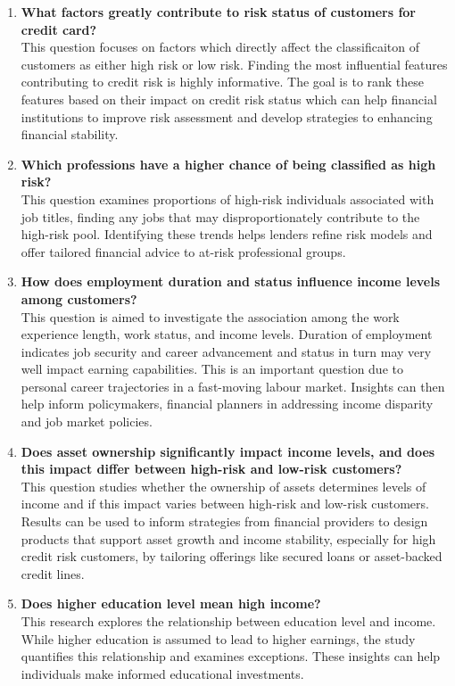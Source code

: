 \documentclass{article}\usepackage[]{graphicx}\usepackage[]{xcolor}
\begin{document}
\begin{enumerate}
\item \textbf{What factors greatly contribute to risk status of customers for credit card?} \\ This question focuses on factors which directly affect the classificaiton of customers as either high risk or low risk. Finding the most influential features contributing to credit risk is highly informative. The goal is to rank these features based on their impact on credit risk status which can help financial institutions to improve risk assessment and develop strategies to enhancing financial stability.\\
\item \textbf{Which professions have a higher chance of being classified as high risk?} \\ This question examines proportions of high-risk individuals associated with job titles, finding any jobs that may disproportionately contribute to the high-risk pool. Identifying these trends helps lenders refine risk models and offer tailored financial advice to at-risk professional groups.\\
\item \textbf{How does employment duration and status influence income levels among customers?} \\ This question is aimed to investigate the association among the work experience length, work status, and income levels. Duration of employment indicates job security and career advancement and status in turn may very well impact earning capabilities. This is an important question due to personal career trajectories in a fast-moving labour market. Insights can then help inform policymakers, financial planners  in addressing income disparity and job market policies.\\
\item \textbf{Does asset ownership significantly impact income levels, and does this impact differ between high-risk and low-risk customers?} \\ This question studies whether the ownership of assets determines levels of income and if this impact varies between high-risk and low-risk customers. Results can be used to inform strategies from financial providers to design products that support asset growth and income stability, especially for high credit risk customers, by tailoring offerings like secured loans or asset-backed credit lines.\\
\item \textbf{Does higher education level mean high income?} \\ This research explores the relationship between education level and income. While higher education is assumed to lead to higher earnings, the study quantifies this relationship and examines exceptions. These insights can help individuals make informed educational investments.\\
\end{enumerate}
\newpage
\end{document}
